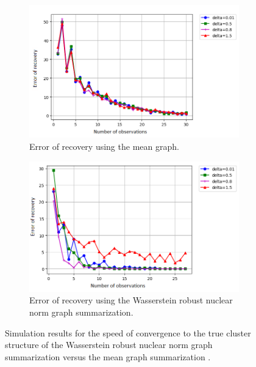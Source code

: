 \documentclass[12pt]{amsart}
\theoremstyle{remark}
\begin{document}
\begin{figure}[H]
     \centering
     \begin{subfigure}[b]{0.8\textwidth}
         \centering
         \includegraphics[width=\textwidth]{./Pictures/speedMean.PNG}
         \caption{Error of recovery using the mean graph.}
     \end{subfigure}
     \hfill
     \begin{subfigure}[b]{0.8\textwidth}
         \centering
         \includegraphics[width=\textwidth]{./Pictures/speedspectral.PNG}
         \caption{Error of recovery using the Wasserstein robust nuclear norm graph summarization.}
     \end{subfigure}
	\caption{Simulation results for the speed of convergence to the true cluster structure of the Wasserstein robust nuclear norm graph summarization versus the mean graph summarization .}
        \label{fig:speed}
\end{figure}
\end{document}
